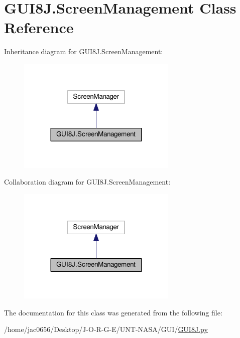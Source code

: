\hypertarget{classGUI8J_1_1ScreenManagement}{}\section{G\+U\+I8\+J.\+Screen\+Management Class Reference}
\label{classGUI8J_1_1ScreenManagement}


Inheritance diagram for G\+U\+I8\+J.\+Screen\+Management\+:\nopagebreak
\begin{figure}[H]
\begin{center}
\leavevmode
\includegraphics[width=215pt]{classGUI8J_1_1ScreenManagement__inherit__graph}
\end{center}
\end{figure}


Collaboration diagram for G\+U\+I8\+J.\+Screen\+Management\+:\nopagebreak
\begin{figure}[H]
\begin{center}
\leavevmode
\includegraphics[width=215pt]{classGUI8J_1_1ScreenManagement__coll__graph}
\end{center}
\end{figure}


The documentation for this class was generated from the following file\+:\begin{DoxyCompactItemize}
\item 
/home/jac0656/\+Desktop/\+J-\/\+O-\/\+R-\/\+G-\/\+E/\+U\+N\+T-\/\+N\+A\+S\+A/\+G\+U\+I/\hyperlink{GUI8J_8py}{G\+U\+I8\+J.\+py}\end{DoxyCompactItemize}
